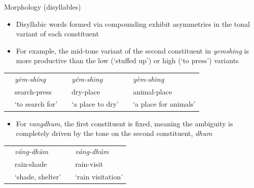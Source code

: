 \documentclass[final]{beamer}
\begin{document}
\begin{frame}[t]
\begin{columns}[t]
\begin{column}{0.85\paperwidth}
\begin{columns}[t,totalwidth=0.85\paperwidth]
\begin{column}{0.4\paperwidth}
\end{column} 


\end{columns} %

\begin{columns}[t,totalwidth=0.85\paperwidth] %

\begin{column}{0.4\paperwidth}
\vspace{-.6in}

\begin{block}{Morphology (disyllables)}
  \begin{itemize}
    \item Disyllabic words formed via compounding exhibit asymmetries in the tonal variant of each constituent
    \item For example, the mid-tone variant of the second constituent in \emph{yemshing} is more productive than the low (`stuffed up') or high (`to press') variants
  \end{itemize}

\bigskip
\bigskip

  \begin{tabular}{p{1in}lp{1in}lp{1in}l}
&    \emph{y\=em-sh\'ing} & & \emph{y\'em-sh\=\i ng} & & \emph{y\`em-sh\=\i ng}\\
&    search-press         & & dry-place        & & animal-place   \\
&    `to search for'      & & `a place to dry' & & `a place for animals' \\
  \end{tabular}

\bigskip
\bigskip

\begin{itemize}
  \item For \emph{vangdhum}, the first constituent is fixed, meaning the ambiguity is completely driven by the tone on the second constituent, \emph{dhum}
\end{itemize}

\bigskip
\bigskip

  \begin{tabular}{p{1in}lp{0.8in}l}
&    \emph{v\'ang-dh\`um} & & \emph{v\'ang-dh\'um} \\
&    rain-shade           & & rain-visit           \\
&    `shade, shelter'     & & `rain visitation' \\
  \end{tabular}


\end{block}
\end{column}
\end{columns}
\end{column}
\end{columns}
\end{frame}
\end{document}
